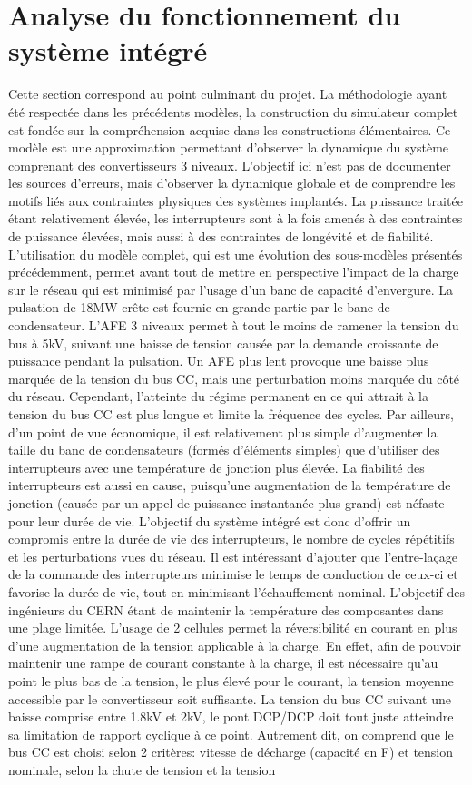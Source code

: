 \section{Analyse du fonctionnement du système intégré}
Cette section correspond au point culminant du projet. La méthodologie ayant été respectée dans les précédents modèles, la construction du simulateur complet est fondée sur la compréhension acquise dans les constructions élémentaires. Ce modèle est une approximation permettant d'observer la dynamique du système comprenant des convertisseurs 3 niveaux. L'objectif ici n'est pas de documenter les sources d'erreurs, mais d'observer la dynamique globale et de comprendre les motifs liés aux contraintes physiques des systèmes implantés. La puissance traitée étant relativement élevée, les interrupteurs sont à la fois amenés à des contraintes de puissance élevées, mais aussi à des contraintes de longévité et de fiabilité. L'utilisation du modèle complet, qui est une évolution des sous-modèles présentés précédemment, permet avant tout de mettre en perspective l'impact de la charge sur le réseau qui est minimisé par l'usage d'un banc de capacité d'envergure. La pulsation de 18MW crête est fournie en grande partie par le banc de condensateur. L'AFE 3 niveaux permet à tout le moins de ramener la tension du bus à 5kV, suivant une baisse de tension causée par la demande croissante de puissance pendant la pulsation. Un AFE plus lent provoque une baisse plus marquée de la tension du bus CC, mais une perturbation moins marquée du côté du réseau. Cependant, l'atteinte du régime permanent en ce qui attrait à la tension du bus CC est plus longue et limite la fréquence des cycles. Par ailleurs, d'un point de vue économique, il est relativement plus simple d'augmenter la taille du banc de condensateurs (formés d'éléments simples) que d'utiliser des interrupteurs avec une température de jonction plus élevée. La fiabilité des interrupteurs est aussi en cause, puisqu'une augmentation de la température de jonction (causée par un appel de puissance instantanée plus grand) est néfaste pour leur durée de vie. L'objectif du système intégré est donc d'offrir un compromis entre la durée de vie des interrupteurs, le nombre de cycles répétitifs et les perturbations vues du réseau. Il est intéressant d'ajouter que l'entre-laçage de la commande des interrupteurs minimise le temps de conduction de ceux-ci et favorise la durée de vie, tout en minimisant l'échauffement nominal. L'objectif des ingénieurs du CERN étant de maintenir la température des composantes dans une plage limitée. L'usage de 2 cellules permet  la réversibilité en courant en plus d'une augmentation de la tension applicable à la charge. En effet, afin de pouvoir  maintenir une rampe de courant constante à la charge, il est nécessaire qu'au point le plus bas de la tension, le plus élevé pour le courant, la tension moyenne accessible par le convertisseur soit suffisante. La tension du bus CC suivant une baisse comprise entre 1.8kV et 2kV, le pont DCP/DCP doit tout juste atteindre sa limitation de rapport cyclique à ce point. Autrement dit, on comprend que le bus CC est choisi selon 2 critères: vitesse de décharge (capacité en F) et tension nominale, selon la chute de tension et la tension 